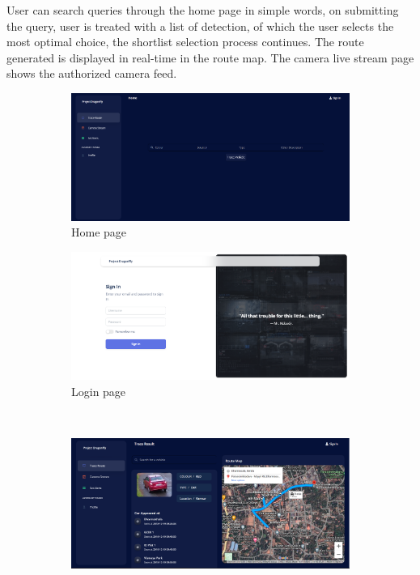 User can search queries through the home page in simple words, on submitting the query, user is treated with a list of detection, of which the user selects the most optimal choice, the shortlist selection process continues. The route generated is displayed in real-time in the route map. The camera live stream page shows the authorized camera feed.
\begin{figure}[!ht]
	\centering
	\begin{subfigure}[b]{0.48\linewidth}
		\centering
		\includegraphics[width=\linewidth]{Images/UI/home}
		\caption{Home page}
		\label{fig:home}
	\end{subfigure} \hfill
	\begin{subfigure}[b]{0.48\linewidth}
		\centering
		\includegraphics[width=\linewidth]{Images/UI/login}
		\caption{Login page}
		\label{fig:login}
	\end{subfigure} \\ \vspace{3mm}
	\begin{subfigure}[b]{0.48\linewidth}
		\centering
		\includegraphics[width=\linewidth]{Images/UI/result}

\end{subfigure}
\end{figure}
